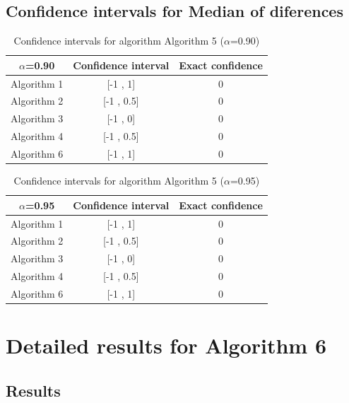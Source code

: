\documentclass[a4paper,10pt]{article}
\begin{document}
\subsection{Confidence intervals for Median of diferences}

\begin{table}[!htp]
\centering\small
\begin{tabular}{
|c|c|c|}
\hline
 $\alpha$=0.90 & Confidence interval & Exact confidence \\ \hline 
Algorithm 1 & [-1 , 1] & 0\\ \hline 
Algorithm 2 & [-1 , 0.5] & 0\\ \hline 
Algorithm 3 & [-1 , 0] & 0\\ \hline 
Algorithm 4 & [-1 , 0.5] & 0\\ \hline 
Algorithm 6 & [-1 , 1] & 0\\ \hline 

\end{tabular}
\caption{Confidence intervals for algorithm Algorithm 5 ($\alpha$=0.90)}
\end{table}
\begin{table}[!htp]
\centering\small
\begin{tabular}{
|c|c|c|}
\hline
 $\alpha$=0.95 & Confidence interval & Exact confidence \\ \hline 
Algorithm 1 & [-1 , 1] & 0\\ \hline 
Algorithm 2 & [-1 , 0.5] & 0\\ \hline 
Algorithm 3 & [-1 , 0] & 0\\ \hline 
Algorithm 4 & [-1 , 0.5] & 0\\ \hline 
Algorithm 6 & [-1 , 1] & 0\\ \hline 

\end{tabular}
\caption{Confidence intervals for algorithm Algorithm 5 ($\alpha$=0.95)}
\end{table}

 \clearpage 


\section{Detailed results for Algorithm 6}


\subsection{Results}
\end{document}
